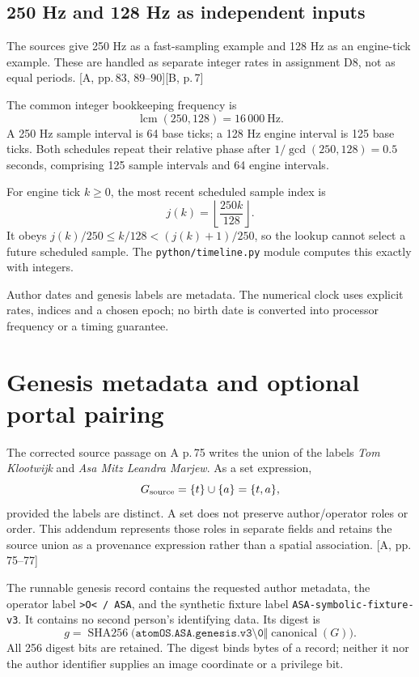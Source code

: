 \documentclass[11pt,a4paper]{article}
\newcommand{\src}[1]{\textcolor{muted}{[A, #1]}}
\newcommand{\fly}[1]{\textcolor{muted}{[B, #1]}}
\newcommand{\code}[1]{\texttt{#1}}
\newcommand{\SHA}{\operatorname{SHA256}}
\begin{document}
\subsection{250 Hz and 128 Hz as independent inputs}
The sources give 250 Hz as a fast-sampling example and 128 Hz as an engine-tick example. These are handled as separate integer rates in assignment D8, not as equal periods. \src{pp.\,83, 89--90}\fly{p.\,7}

The common integer bookkeeping frequency is
\begin{equation}
\operatorname{lcm}(250,128)=16\,000\ \mathrm{Hz}.
\end{equation}
A 250 Hz sample interval is 64 base ticks; a 128 Hz engine interval is 125 base ticks. Both schedules repeat their relative phase after $1/\gcd(250,128)=0.5$ seconds, comprising 125 sample intervals and 64 engine intervals.

For engine tick $k\ge0$, the most recent scheduled sample index is
\begin{equation}
j(k)=\left\lfloor\frac{250k}{128}\right\rfloor.
\end{equation}
It obeys $j(k)/250\le k/128<(j(k)+1)/250$, so the lookup cannot select a future scheduled sample. The \code{python/timeline.py} module computes this exactly with integers.

Author dates and genesis labels are metadata. The numerical clock uses explicit rates, indices and a chosen epoch; no birth date is converted into processor frequency or a timing guarantee.
\clearpage

\section{Genesis metadata and optional portal pairing}
The corrected source passage on A p.\,75 writes the union of the labels \emph{Tom Klootwijk} and \emph{Asa Mitz Leandra Marjew}. As a set expression,
\begin{equation}
G_{\rm source}=\{t\}\cup\{a\}=\{t,a\},
\end{equation}
provided the labels are distinct. A set does not preserve author/operator roles or order. This addendum represents those roles in separate fields and retains the source union as a provenance expression rather than a spatial association. \src{pp.\,75--77}

The runnable genesis record contains the requested author metadata, the operator label \code{>O< / ASA}, and the synthetic fixture label \code{ASA-symbolic-fixture-v3}. It contains no second person's identifying data. Its digest is
\begin{equation}
g=\SHA\bigl(\code{atomOS.ASA.genesis.v3\textbackslash0}\Vert\operatorname{canonical}(G)\bigr).
\end{equation}
All 256 digest bits are retained. The digest binds bytes of a record; neither it nor the author identifier supplies an image coordinate or a privilege bit.
\end{document}
